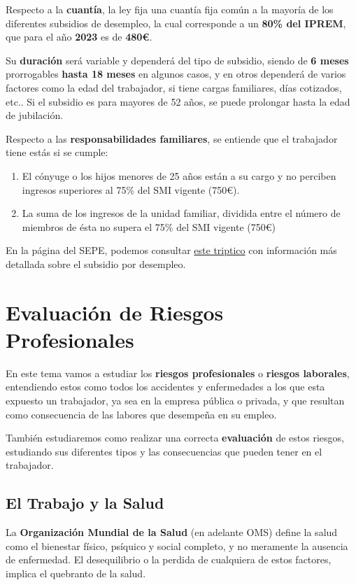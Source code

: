 Respecto a la \textbf{cuantía}, la ley fija una cuantía fija común a la mayoría de los diferentes subsidios de desempleo, la cual corresponde a un \textbf{80\% del IPREM}, que para el año \textbf{2023} es de \textbf{480€}.

Su \textbf{duración} será variable y dependerá del tipo de subsidio, siendo de \textbf{6 meses} prorrogables \textbf{hasta 18 meses} en algunos casos, y en otros dependerá de varios factores como la edad del trabajador, si tiene cargas familiares, días cotizados, etc.. Si el subsidio es para mayores de 52 años, se puede prolongar hasta la edad de jubilación.

Respecto a las \textbf{responsabilidades familiares}, se entiende que el trabajador tiene estás si se cumple:

\begin{enumerate}
    \item El cónyuge o los hijos menores de 25 años están a su cargo y no perciben ingresos superiores al 75\% del SMI vigente (750€).
    \item La suma de los ingresos de la unidad familiar, dividida entre el número de miembros de ésta no supera el 75\% del SMI vigente (750€)
\end{enumerate}

En la página del SEPE, podemos consultar \href{https://www.seg-social.es/wps/portal/wss/internet/InformacionUtil/44539/47006}{este triptico} con información más detallada sobre el subsidio por desempleo.

\chapter{Evaluación de Riesgos Profesionales}

En este tema vamos a estudiar los \textbf{riesgos profesionales} o \textbf{riesgos laborales}, entendiendo estos como todos los accidentes y enfermedades a los que esta expuesto un trabajador, ya sea en la empresa pública o privada, y que resultan como consecuencia de las labores que desempeña en su empleo.

También estudiaremos como realizar una correcta \textbf{evaluación} de estos riesgos, estudiando sus diferentes tipos y las consecuencias que pueden tener en el trabajador.

\section{El Trabajo y la Salud}
La \textbf{Organización Mundial de la Salud} (en adelante OMS) define la salud como el bienestar físico, psíquico y social completo, y no meramente la ausencia de enfermedad. El desequilibrio o la perdida de cualquiera de estos factores, implica el quebranto de la salud.

